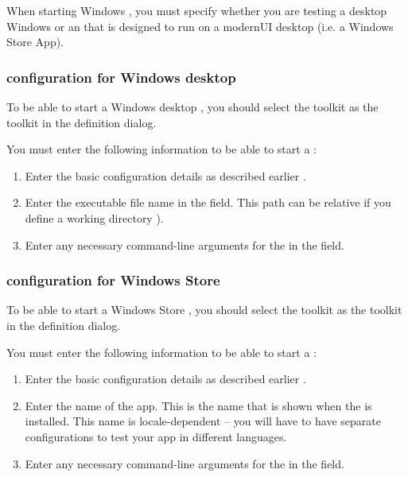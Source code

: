 
When starting Windows \gdauts{},  you must specify whether you are testing a desktop Windows \gdaut{} or an \gdaut{} that is designed to run on a modernUI desktop (i.e. a Windows Store App). 

\subsubsection{\gdaut{} configuration for Windows desktop \gdauts{}}
To be able to start a Windows desktop \gdaut{}, you should select the  toolkit as the \gdaut{} toolkit in the \gdaut{} definition dialog. 

You must enter the following information to be able to start a  \gdaut{}:
\begin{enumerate}
\item Enter the basic configuration details as described earlier .
\item Enter the executable file name in the  field. This path can be relative if you define a working directory ).
\item Enter any necessary command-line arguments for the \gdaut{} in the
  field. 
  
\end{enumerate}

\subsubsection{\gdaut{} configuration for Windows Store \gdauts{}}
To be able to start a Windows Store \gdaut{}, you should select the  toolkit as the \gdaut{} toolkit in the \gdaut{} definition dialog. 

You must enter the following information to be able to start a  \gdaut{}:
\begin{enumerate}
\item Enter the basic configuration details as described earlier .
\item Enter the name of the app. This is the name that is shown when the \gdaut{} is installed. This name is locale-dependent -- you will have to have separate \gdaut{} configurations to test your app in different languages. 
\item Enter any necessary command-line arguments for the \gdaut{} in the
  field. 
  
\end{enumerate}
